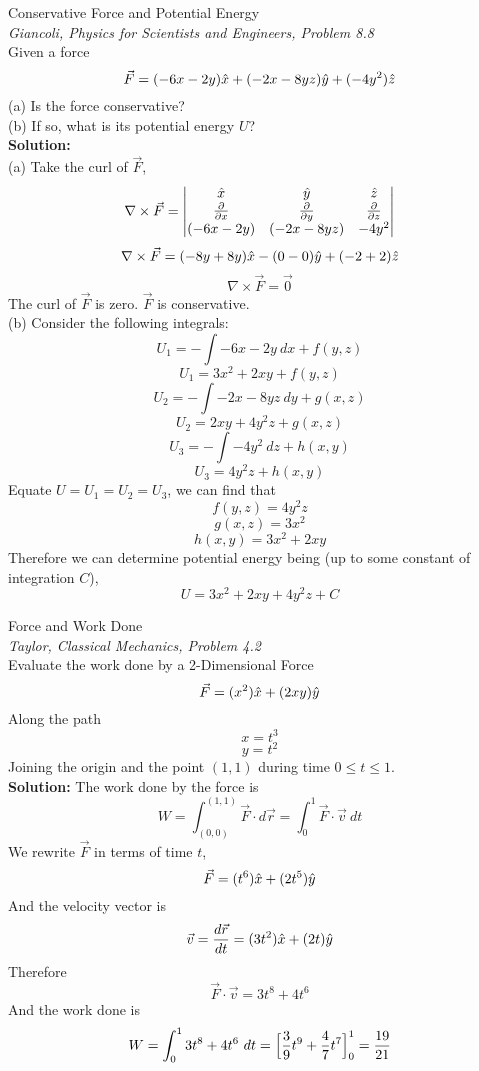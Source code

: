 \documentclass[11pt]{article}
\theoremstyle{gangnamstyle}{\newtheorem{definition}{Definition}[]}
\theoremstyle{gangnamstyle}{\newtheorem{example}{Example}[]}
\theoremstyle{gangnamstyle}{\newtheorem{problem}{Problem}[]}
\begin{document}
\begin{example}
Conservative Force and Potential Energy \\
\textit{Giancoli, Physics for Scientists and Engineers, Problem 8.8} \\
Given a force
\[ \Vec{F} = (-6x - 2y)\Hat{x} + (-2x -8yz)\Hat{y} + (-4y^2)\Hat{z} \]
(a) Is the force conservative? \\
(b) If so, what is its potential energy $U$? \\

\textbf{Solution:} \\
(a) Take the curl of $\Vec{F}$, 
\[ \nabla \times \Vec{F} = 
\begin{vmatrix}
\Hat{x} & \Hat{y} & \Hat{z} \\
\frac{\partial }{\partial x} & \frac{\partial }{\partial y} & \frac{\partial }{\partial z} \\
(-6x - 2y) & (-2x -8yz) & -4y^2
\end{vmatrix} \]
\[ \nabla \times \Vec{F} = (-8y + 8y)\Hat{x} - (0 - 0)\Hat{y} + (-2 + 2)\Hat{z} \]
\[ \nabla \times \Vec{F} = \Vec{0} \]
The curl of $\Vec{F}$ is zero. $\Vec{F}$ is conservative. \\

(b) Consider the following integrals: 
\[ U_1 = - \int -6x - 2y \ dx + f(y, z) \]
\[ U_1 = 3x^2 + 2xy + f(y, z) \]
\[ U_2 = - \int -2x -8yz \ dy + g(x, z) \]
\[ U_2 = 2xy + 4y^2 z + g(x, z) \]
\[ U_3 = - \int -4y^2 \ dz + h(x, y) \]
\[ U_3 = 4y^2 z + h(x, y) \]
Equate $U = U_1 = U_2 = U_3$, we can find that
\[ f(y, z) = 4y^2 z \]
\[ g(x, z) = 3x^2 \]
\[ h(x, y) = 3x^2 + 2xy \]
Therefore we can determine potential energy being (up to some constant of integration $C$),
\[ U = 3x^2 + 2xy +4y^2z + C \]
\end{example}

\pagebreak

\begin{example}
Force and Work Done \\
\textit{Taylor, Classical Mechanics, Problem 4.2} \\
Evaluate the work done by a 2-Dimensional Force
\[ \Vec{F} = (x^2)\Hat{x} + (2xy)\Hat{y} \]
Along the path
\[ x = t^3 \]
\[ y = t^2 \]
Joining the origin and the point $(1, 1)$ during time $0 \leq t \leq 1$. \\

\textbf{Solution:} The work done by the force is
\[ W = \int_{(0, 0)}^{(1, 1)} \Vec{F} \cdot d\Vec{r} = \int_0^1 \Vec{F} \cdot \Vec{v} \ dt \]
We rewrite $\Vec{F}$ in terms of time $t$, 
\[ \Vec{F} = (t^6)\Hat{x} + (2t^5)\Hat{y} \]
And the velocity vector is
\[ \Vec{v} = \frac{d\Vec{r}}{dt} = (3t^2) \Hat{x} + (2t) \Hat{y} \]
Therefore
\[ \Vec{F} \cdot \Vec{v} = 3t^8 + 4t^6 \]
And the work done is
\[ W = \int_0^1 3t^8 + 4t^6 \ dt = \Bigl[ \frac{3}{9}t^9 + \frac{4}{7} t^7 \Bigr]_0^1 = \frac{19}{21} \]
\end{example}
\end{document}
